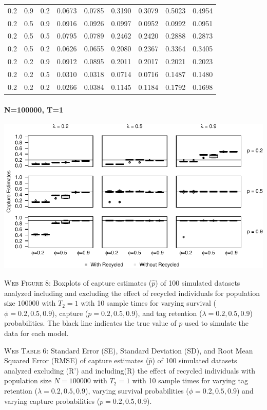 \documentclass[]{article}
\let\oldparagraph\paragraph
\renewcommand{\paragraph}[1]{\oldparagraph{#1}\mbox{}}
\begin{document}
\begin{table}[ht]
{\begin{tabular}{rrrrrrrrr}
  0.2 & 0.9 & 0.2 & 0.0673 & 0.0785 & 0.3190 & 0.3079 & 0.5023 & 0.4954 \\ 
  0.2 & 0.5 & 0.9 & 0.0916 & 0.0926 & 0.0997 & 0.0952 & 0.0992 & 0.0951 \\ 
  0.2 & 0.5 & 0.5 & 0.0795 & 0.0789 & 0.2462 & 0.2420 & 0.2888 & 0.2873 \\ 
  0.2 & 0.5 & 0.2 & 0.0626 & 0.0655 & 0.2080 & 0.2367 & 0.3364 & 0.3405 \\ 
  0.2 & 0.2 & 0.9 & 0.0912 & 0.0895 & 0.2011 & 0.2017 & 0.2021 & 0.2023 \\ 
  0.2 & 0.2 & 0.5 & 0.0310 & 0.0318 & 0.0714 & 0.0716 & 0.1487 & 0.1480 \\ 
  0.2 & 0.2 & 0.2 & 0.0266 & 0.0384 & 0.1145 & 0.1184 & 0.1792 & 0.1698 \\ 
   \hline
\end{tabular}
}
\endgroup
\end{table}

\newpage

\paragraph{N=100000, T=1}\label{n100000-t1-1}

\includegraphics{Appendix_BW_files/figure-latex/8_capture_GJSTL2-1.pdf}

\textsc{Web Figure 8:} Boxplots of capture estimates (\(\hat{p}\)) of
100 simulated datasets analyzed including and excluding the effect of recycled
individuals for population size \(100000\) with \(T_2=1\) with 10 sample times for varying survival (\(\phi=0.2,0.5,0.9\)), capture
(\(p=0.2,0.5,0.9\)), and tag retention (\(\lambda=0.2,0.5,0.9\))
probabilities. The black line indicates the true value of \(p\) used to
simulate the data for each model.

\textsc{Web Table 6:} Standard Error (SE), Standard Deviation (SD), and
Root Mean Squared Error (RMSE) of capture estimates (\(\hat{p}\)) of 100
simulated datasets analyzed excluding (R') and including(R) the effect of
recycled individuals with population size \(N=100000\) with \(T_2=1\)
with 10 sample times for varying tag retention
(\(\lambda=0.2,0.5,0.9\)), varying survival probabilities
(\(\phi=0.2,0.5,0.9\)) and varying capture probabilities
(\(p=0.2,0.5,0.9\)).
\end{document}
